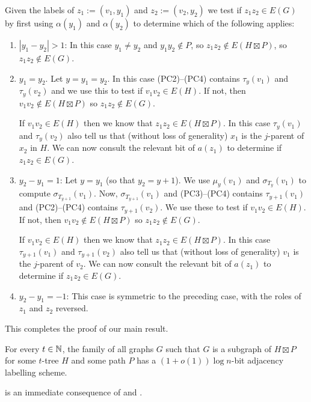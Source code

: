 \documentclass[kpfonts]{patmorin}
\begin{document}
Given the labels of $z_1:=(v_1,y_1)$ and $z_2:=(v_2,y_2)$ we test if $z_1z_2\in E(G)$ by first using $\alpha(y_1)$ and $\alpha(y_2)$ to determine which of the following applies:
\begin{enumerate}
  \item $|y_1-y_2|>1$: In this case $y_1\neq y_2$ and $y_1y_2\not\in P$, so $z_1z_2\not\in E(H\boxtimes P)$, so $z_1z_2\not\in E(G)$.

  \item $y_1=y_2$.  Let $y=y_1=y_2$.  In this case (PC2)--(PC4) contains $\tau_{y}(v_1)$ and $\tau_{y}(v_2)$ and we use this to test if $v_1v_2\in E(H)$.  If not, then $v_1v_2\not\in E(H\boxtimes P)$ so $z_1z_2\not\in E(G)$.  
  
  If $v_1v_2\in E(H)$ then we know that $z_1z_2\in E(H\boxtimes P)$.  In this case $\tau_{y}(v_1)$ and $\tau_{y}(v_2)$ also tell us that (without loss of generality) $x_1$ is the $j$-parent of $x_2$ in $H$.  We can now consult the relevant bit of $a(z_1)$ to determine if $z_1z_2\in E(G)$.

  \item $y_2-y_1=1$: Let $y=y_1$ (so that $y_2=y+1$).  We use $\mu_y(v_1)$ and $\sigma_{T_y}(v_1)$ to compute $\sigma_{T_{y+1}}(v_1)$.  Now, $\sigma_{T_{y+1}}(v_1)$ and (PC3)--(PC4) contains $\tau_{y+1}(v_1)$ and (PC2)--(PC4) contains $\tau_{y+1}(v_2)$.  We use these to test if $v_1v_2\in E(H)$.  If not, then $v_1v_2\not\in E(H\boxtimes P)$ so $z_1z_2\not\in E(G)$.  
  
  If $v_1v_2\in E(H)$ then we know that $z_1z_2\in E(H\boxtimes P)$.  In this case $\tau_{y+1}(v_1)$ and $\tau_{y+1}(v_2)$ also tell us that (without loss of generality) $v_1$ is the $j$-parent of $v_2$.  We can now consult the relevant bit of $a(z_1)$ to determine if $z_1z_2\in E(G)$.

  \item $y_2-y_1=-1$:  This case is symmetric to the preceding case, with the roles of $z_1$ and $z_2$ reversed.
\end{enumerate}

This completes the proof of our main result.

\begin{thm}
  For every $t\in\mathbb{N}$, the family of all graphs $G$ such that $G$ is a subgraph of $H\boxtimes P$ for some $t$-tree $H$ and some path $P$ has a $(1+o(1))\log n$-bit adjacency labelling scheme.
\end{thm}

 is an immediate consequence of  and . 
\end{document}
